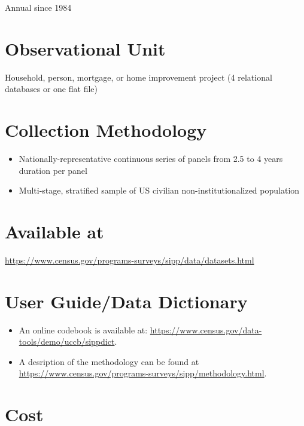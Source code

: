 \documentclass[
]{book}
\providecommand{\tightlist}{%
  \setlength{\itemsep}{0pt}\setlength{\parskip}{0pt}}
\begin{document}
Annual since 1984

\hypertarget{observational-unit-88}{%
\section{Observational Unit}\label{observational-unit-88}}

Household, person, mortgage, or home improvement project (4 relational databases or one flat file)

\hypertarget{collection-methodology-88}{%
\section{Collection Methodology}\label{collection-methodology-88}}

\begin{itemize}
\tightlist
\item
  Nationally-representative continuous series of panels from 2.5 to 4 years duration per panel
\item
  Multi-stage, stratified sample of US civilian non-institutionalized population
\end{itemize}

\hypertarget{available-at-88}{%
\section{Available at}\label{available-at-88}}

\url{https://www.census.gov/programs-surveys/sipp/data/datasets.html}

\hypertarget{user-guidedata-dictionary-88}{%
\section{User Guide/Data Dictionary}\label{user-guidedata-dictionary-88}}

\begin{itemize}
\tightlist
\item
  An online codebook is available at: \url{https://www.census.gov/data-tools/demo/uccb/sippdict}.
\item
  A desription of the methodology can be found at \url{https://www.census.gov/programs-surveys/sipp/methodology.html}.
\end{itemize}

\hypertarget{cost-88}{%
\section{Cost}\label{cost-88}}
\end{document}
